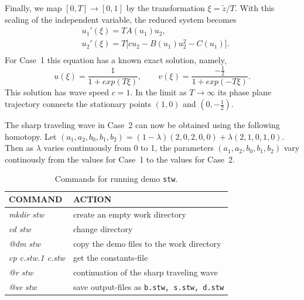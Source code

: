 \documentclass[12pt]{report}
\begin{document}
\newpage 
Finally, we  map $ [0,T] \rightarrow [0,1] $
by the transformation $\xi = \tilde z / T$.
With this scaling of the independent variable, the reduced system
becomes
\begin{equation} \begin{array}{cl}
  & u_1'(\xi) = T A(u_1) u_2,  \\
  & u_2'(\xi) = T \bigl[ c u_2 - B(u_1) u_2^{2} - C(u_1)\bigr]. \\
\end{array} \end{equation}
For Case~1 this equation has a known exact solution, namely,
$$ u(\xi) = \frac{ 1 }{ 1 + exp(T\xi) }, \qquad
  v(\xi) = \frac{ -\frac{1 }{ 2}  }{ 1 + exp(-T\xi) }. $$
This solution has wave speed $c=1$.
In the limit as $T \rightarrow \infty$ its phase plane trajectory
connects the stationary points $(1,0)$ and $(0,-\frac{1 }{ 2})$.
 
The sharp traveling wave in Case~2
can now be obtained using the following homotopy.
Let
$(a_1,a_2,b_0,b_1,b_2) =
  (1-\lambda) (2,0,2,0,0) + \lambda (2,1,0,1,0)$.
Then as $\lambda$ varies continuously from 0 to 1, the parameters
$(a_1,a_2,b_0,b_1,b_2)$
vary continously from the values for Case~1
  to the values for Case~2.


\begin{table}[htbp]
\begin{center}
\begin{tabular}{| l | l |}
\hline
  COMMAND  & ACTION \\
\hline
  {\it mkdir stw} & create an empty work directory \\ 
  {\it cd stw} & change directory \\
  {\it @dm stw} & copy the demo files to the work directory \\
\hline
  {\it cp c.stw.1 c.stw} & get the constants-file \\ 
  {\it @r stw} & continuation of the sharp traveling wave \\ 
  {\it @sv stw} & save output-files as {\tt b.stw, s.stw, d.stw} \\ 
\hline
\end{tabular}
\caption{Commands for running demo {\tt stw}.}
\label{tbl:demo_stw_2}
\end{center}
\end{table}
\end{document}
